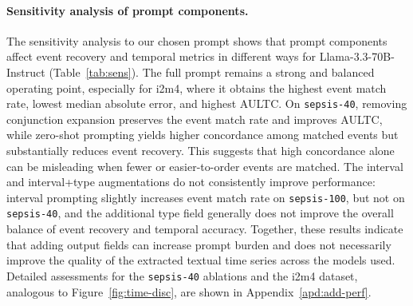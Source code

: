 \documentclass[pmlr,twocolumn,10pt]{jmlr} %
\begin{document}
\paragraph{Sensitivity analysis of prompt components.}
The sensitivity analysis to our chosen prompt shows that prompt components affect event recovery and temporal metrics in different ways for Llama-3.3-70B-Instruct (Table~\ref{tab:sens}).
The full prompt remains a strong and balanced operating point, especially for i2m4, where it obtains the highest event match rate, lowest median absolute error, and highest AULTC.
On \texttt{sepsis-40}, removing conjunction expansion preserves the event match rate and improves AULTC, while zero-shot prompting yields higher concordance among matched events but substantially reduces event recovery.
This suggests that high concordance alone can be misleading when fewer or easier-to-order events are matched.
The interval and interval+type augmentations do not consistently improve performance: interval prompting slightly increases event match rate on \texttt{sepsis-100}, but not on \texttt{sepsis-40}, and the additional type field generally does not improve the overall balance of event recovery and temporal accuracy.
Together, these results indicate that adding output fields can increase prompt burden and does not necessarily improve the quality of the extracted textual time series across the models used.
Detailed assessments for the \texttt{sepsis-40} ablations and the i2m4 dataset, analogous to Figure~\ref{fig:time-disc}, are shown in Appendix~\ref{apd:add-perf}.

\end{document}
